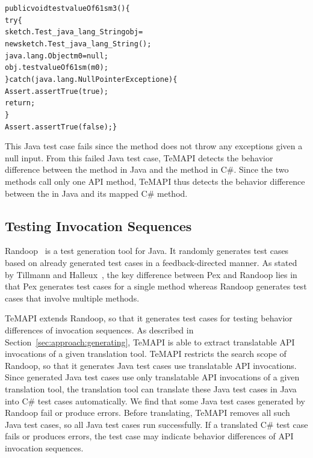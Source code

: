 \begin{CodeOut}%
\begin{alltt}
 public void testvalueOf61sm3()\{
   try\{
     sketch.Test_java_lang_String obj =
           new sketch.Test_java_lang_String();
     java.lang.Object m0 = null;
     obj.testvalueOf61sm(m0);
   \}catch(java.lang.NullPointerException e)\{
     Assert.assertTrue(true);
     return;
   \}
   Assert.assertTrue(false); \}
\end{alltt}
\end{CodeOut}

This Java test case fails since the  method does not throw any exceptions given a null input.
From this failed Java test case, TeMAPI detects the behavior difference between the  method in Java and the  method in C\#. Since the two methods call only one API method, TeMAPI thus detects the behavior difference between the  in Java and its mapped C\# method.

\subsection{Testing Invocation Sequences}
\label{sec:approach:sequence}
Randoop~\cite{pacheco2007feedback} is a test generation tool for Java. It randomly generates test cases based on already generated test cases in a feedback-directed manner. As stated by Tillmann and Halleux~\cite{tillmann2008pex}, the key difference between Pex and Randoop lies in that Pex generates test cases for a single method whereas Randoop generates test cases that involve multiple methods.

TeMAPI extends Randoop, so that it generates test cases for testing behavior differences of invocation sequences. As described in Section~\ref{sec:approach:generating}, TeMAPI is able to extract translatable API invocations of a given translation tool. TeMAPI restricts the search scope of Randoop, so that it generates Java test cases use translatable API invocations. Since generated Java test cases use only translatable API invocations of a given translation tool, the translation tool can translate these Java test cases in Java into C\# test cases automatically. We find that some Java test cases generated by Randoop fail or produce errors. Before translating, TeMAPI removes all such Java test cases, so all Java test cases run successfully. If a translated C\# test case fails or produces errors, the test case may indicate behavior differences of API invocation sequences.

